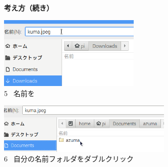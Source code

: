 \documentclass[a4paper,12pt]{jarticle}
\begin{document}
\clearpage
\begin{figure}[t]
  \textbf{考え方（続き）}



  \centering
  \begin{minipage}{\textwidth}
    \begin{minipage}{7.289cm}
      \includegraphics[width=6.8cm]{textbook-img097.png}\\
      5 \ 名前を
    \end{minipage}
    \begin{minipage}{1.582cm}
    \end{minipage}
    \begin{minipage}{6.582cm}
      \includegraphics[width=8.375cm]{textbook-img098.png}\\
      6 \ 自分の名前フォルダをダブルクリック
    \end{minipage}
  \end{minipage}


  \bigskip


\end{figure}
\end{document}

